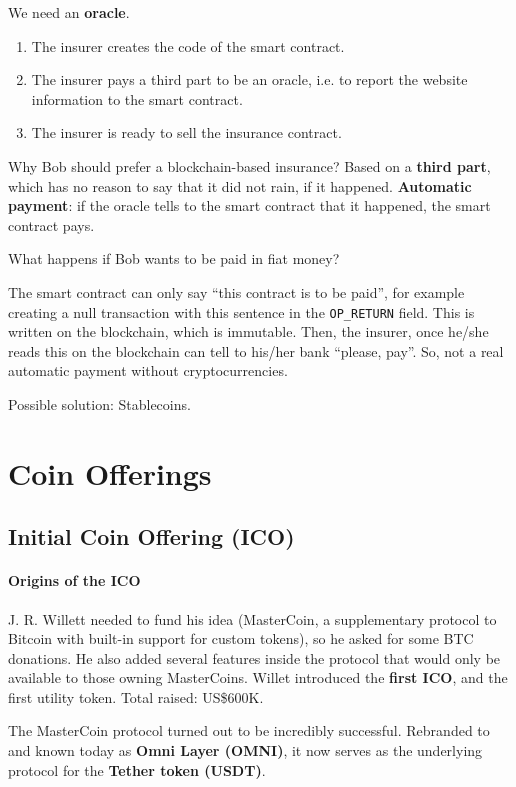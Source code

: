We need an \textbf{oracle}.
\begin{enumerate}
	\item The insurer creates the code of the smart contract.
	\item The insurer pays a third part to be an oracle, i.e. to report the website information to the smart contract.
	\item The insurer is ready to sell the insurance contract.
\end{enumerate}

Why Bob should prefer a blockchain-based insurance? Based on a \textbf{third part}, which has no reason to say that it did not rain, if it happened.
\textbf{Automatic payment}: if the oracle tells to the smart contract that it happened, the smart contract pays.

What happens if Bob wants to be paid in fiat money?

The smart contract can only say ``this contract is to be paid'', for example creating a null transaction with this sentence in the \texttt{OP\_RETURN} field. This is written on the blockchain, which is immutable. Then, the insurer, once he/she reads this on the blockchain can tell to his/her bank ``please, pay''.
So, not a real automatic payment without cryptocurrencies.

Possible solution: Stablecoins.

\section{Coin Offerings}

\subsection{Initial Coin Offering (ICO)}

\paragraph{Origins of the ICO} J. R. Willett needed to fund his idea (MasterCoin, a supplementary protocol to Bitcoin with built-in support for custom tokens), so he asked for some BTC donations. He also added several features inside the protocol that would only be available to those owning MasterCoins.
Willet introduced the \textbf{first ICO}, and the first utility token.
Total raised: US\$600K.

The MasterCoin protocol turned out to be incredibly successful. Rebranded to and known today as \textbf{Omni Layer (OMNI)}, it now serves as the underlying protocol for the \textbf{Tether token (USDT)}.

